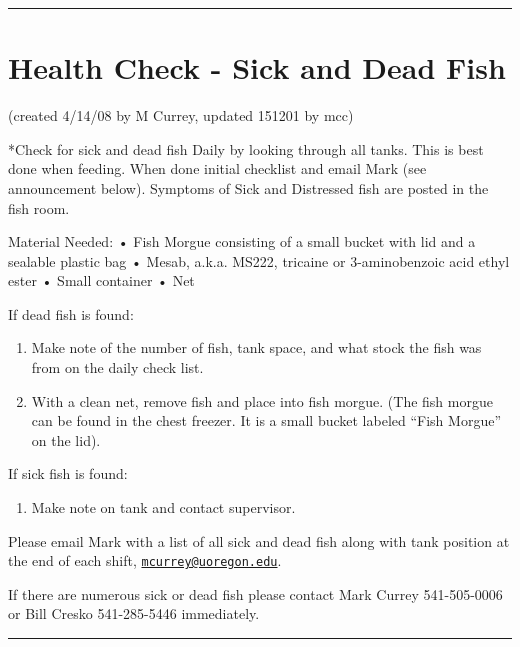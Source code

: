 \documentclass[
]{book}
\providecommand{\tightlist}{%
  \setlength{\itemsep}{0pt}\setlength{\parskip}{0pt}}
\begin{document}
\begin{center}\rule{0.5\linewidth}{0.5pt}\end{center}

\hypertarget{health-check---sick-and-dead-fish}{%
\section{Health Check - Sick and Dead Fish}\label{health-check---sick-and-dead-fish}}

(created 4/14/08 by M Currey, updated 151201 by mcc)

*Check for sick and dead fish Daily by looking through all tanks. This is best done when feeding. When done initial checklist and email Mark (see announcement below). Symptoms of Sick and Distressed fish are posted in the fish room.

Material Needed:
• Fish Morgue consisting of a small bucket with lid and a sealable plastic bag
• Mesab, a.k.a. MS222, tricaine or 3-aminobenzoic acid ethyl ester
• Small container
• Net

If dead fish is found:

\begin{enumerate}
\def\labelenumi{\arabic{enumi}.}
\tightlist
\item
  Make note of the number of fish, tank space, and what stock the fish was from on the daily check list.
\item
  With a clean net, remove fish and place into fish morgue. (The fish morgue can be found in the chest freezer. It is a small bucket labeled ``Fish Morgue'' on the lid).
\end{enumerate}

If sick fish is found:

\begin{enumerate}
\def\labelenumi{\arabic{enumi}.}
\tightlist
\item
  Make note on tank and contact supervisor.
\end{enumerate}

Please email Mark with a list of all sick and dead fish along with tank position at the end of each shift, \href{mailto:mcurrey@uoregon.edu}{\nolinkurl{mcurrey@uoregon.edu}}.

If there are numerous sick or dead fish please contact Mark Currey 541-505-0006 or Bill Cresko 541-285-5446 immediately.

\begin{center}\rule{0.5\linewidth}{0.5pt}\end{center}
\end{document}
